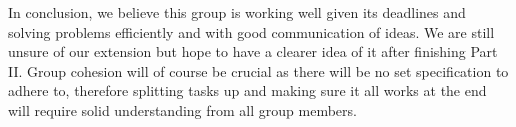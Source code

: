 \documentclass{article}
\begin{document}
In conclusion, we believe this group is working well given its deadlines and solving problems efficiently and with good communication of ideas. We are still unsure of our extension but hope to have a clearer idea of it after finishing Part II. Group cohesion will of course be crucial as there will be no set specification to adhere to, therefore splitting tasks up and making sure it all works at the end will require solid understanding from all group members.
\end{document}
